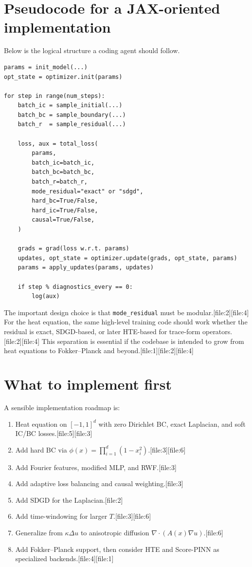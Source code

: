 \documentclass[11pt]{report}
\begin{document}
\section{Pseudocode for a JAX-oriented implementation}

Below is the logical structure a coding agent should follow.

\begin{verbatim}
params = init_model(...)
opt_state = optimizer.init(params)

for step in range(num_steps):
    batch_ic = sample_initial(...)
    batch_bc = sample_boundary(...)
    batch_r  = sample_residual(...)

    loss, aux = total_loss(
        params,
        batch_ic=batch_ic,
        batch_bc=batch_bc,
        batch_r=batch_r,
        mode_residual="exact" or "sdgd",
        hard_bc=True/False,
        hard_ic=True/False,
        causal=True/False,
    )

    grads = grad(loss w.r.t. params)
    updates, opt_state = optimizer.update(grads, opt_state, params)
    params = apply_updates(params, updates)

    if step % diagnostics_every == 0:
        log(aux)
\end{verbatim}

The important design choice is that \texttt{mode\_residual} must be modular.[file:2][file:4]  
For the heat equation, the same high-level training code should work whether the residual is exact, SDGD-based, or later HTE-based for trace-form operators.[file:2][file:4]  
This separation is essential if the codebase is intended to grow from heat equations to Fokker--Planck and beyond.[file:1][file:2][file:4]

\section{What to implement first}

A sensible implementation roadmap is:
\begin{enumerate}[label=\arabic*.]
\item Heat equation on \([-1,1]^d\) with zero Dirichlet BC, exact Laplacian, and soft IC/BC losses.[file:5][file:3]
\item Add hard BC via \(\phi(x)=\prod_{i=1}^d (1-x_i^2)\).[file:3][file:6]
\item Add Fourier features, modified MLP, and RWF.[file:3]
\item Add adaptive loss balancing and causal weighting.[file:3]
\item Add SDGD for the Laplacian.[file:2]
\item Add time-windowing for larger \(T\).[file:3][file:6]
\item Generalize from \(\kappa \Delta u\) to anisotropic diffusion \(\nabla\cdot(A(x)\nabla u)\).[file:6]
\item Add Fokker--Planck support, then consider HTE and Score-PINN as specialized backends.[file:4][file:1]
\end{enumerate}
\end{document}
